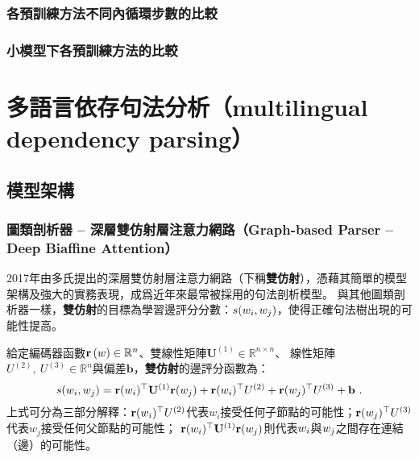 \subsubsection{各預訓練方法不同內循環步數的比較}



\pagebreak
\subsubsection{小模型下各預訓練方法的比較}





\section{多語言依存句法分析（multilingual dependency parsing）}

\subsection{模型架構}

\subsubsection{圖類剖析器 -- 深層雙仿射層注意力網路（Graph-based Parser -- Deep Biaffine Attention）}

2017年由多氏\cite{Dozat2017DeepBA}提出的深層雙仿射層注意力網路（下稱\textbf{雙仿射}），憑藉其簡單的模型架構及強大的實務表現，成爲近年來最常被採用的句法剖析模型。
與其他圖類剖析器一樣，\textbf{雙仿射}的目標為學習邊評分分數：$s(w_{i}, w_{j})$，使得正確句法樹出現的可能性提高。

給定編碼器函數$\mathbf{r}\left(w\right) \in \mathbb{R}^{n}$、雙線性矩陣$\mathbf{U}^{(1)} \in \mathbb{R}^{n \times n}$、
線性矩陣$U^{(2)},\ U^{(3)} \in \mathbb{R}^{n} $與偏差$\mathbf{b}$，\textbf{雙仿射}的邊評分函數為：
\begin{equation}
    s(w_{i}, w_{j}) = \mathbf{r}(w_{i})^{\top} \mathbf{U}^{(1)} \mathbf{r}(w_{j}) + \mathbf{r}(w_{i})^{\top} U^{(2)} + \mathbf{r}(w_{j})^{\top} U^{(3)} + \mathbf{b}\ .
\end{equation}
上式可分為三部分解釋：$\mathbf{r}(w_{i})^{\top} U^{(2)}$代表$w_{i}$接受任何子節點的可能性；$\mathbf{r}(w_{j})^{\top} U^{(3)}$代表$w_{j}$接受任何父節點的可能性；
$\mathbf{r}(w_{i})^{\top} \mathbf{U}^{(1)} \mathbf{r}(w_{j})$則代表$w_{i}$與$w_{j}$之間存在連結（邊）的可能性。

